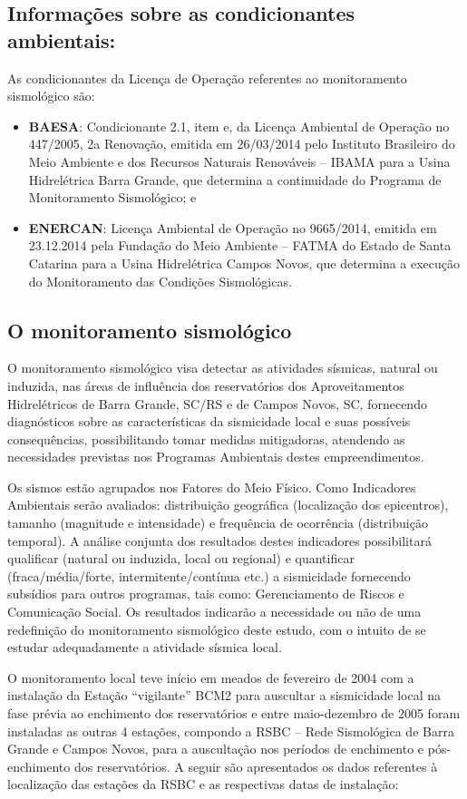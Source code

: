 \subsection{Informações sobre as condicionantes ambientais:}
As condicionantes da Licença de Operação referentes ao monitoramento sismológico são:
\begin{itemize}
    \item \textbf{BAESA}: Condicionante 2.1, item e, da Licença Ambiental de Operação no 447/2005, 2a Renovação, emitida em 26/03/2014 pelo Instituto Brasileiro do Meio Ambiente e dos Recursos Naturais Renováveis – IBAMA para a Usina Hidrelétrica Barra Grande, que determina a continuidade do Programa de Monitoramento Sismológico; e
    \item \textbf{ENERCAN}: Licença Ambiental de Operação no 9665/2014, emitida em 23.12.2014 pela Fundação do Meio Ambiente – FATMA do Estado de Santa Catarina para a Usina Hidrelétrica Campos Novos, que determina a execução do Monitoramento das Condições Sismológicas.
\end{itemize}

\subsection{O monitoramento sismológico}
\par{O monitoramento sismológico visa detectar as atividades sísmicas, natural ou induzida, nas áreas de influência dos reservatórios dos Aproveitamentos Hidrelétricos de Barra Grande, SC/RS e de Campos Novos, SC, fornecendo diagnósticos sobre as características da sismicidade local e suas possíveis consequências, possibilitando tomar medidas mitigadoras, atendendo as necessidades previstas nos Programas Ambientais destes empreendimentos.}
\par{Os sismos estão agrupados nos Fatores do Meio Físico. Como Indicadores Ambientais serão avaliados: distribuição geográfica (localização dos epicentros), tamanho (magnitude e intensidade) e frequência de ocorrência (distribuição temporal). A análise conjunta dos resultados destes indicadores possibilitará qualificar (natural ou induzida, local ou regional) e quantificar (fraca/média/forte, intermitente/contínua etc.) a sismicidade fornecendo subsídios para outros programas, tais como: Gerenciamento de Riscos e Comunicação Social. Os resultados indicarão a necessidade ou não de uma redefinição do monitoramento sismológico deste estudo, com o intuito de se estudar adequadamente a atividade sísmica local.}
\par{O monitoramento local teve início em meados de fevereiro de 2004 com a instalação da Estação “vigilante” BCM2 para auscultar a sismicidade local na fase  prévia ao enchimento dos reservatórios e entre maio-dezembro de 2005 foram instaladas as outras 4 estações, compondo a RSBC – Rede Sismológica de Barra Grande e Campos Novos, para a auscultação nos períodos de enchimento e pós-enchimento dos reservatórios.}
\clearpage
A seguir são apresentados os dados referentes à localização das estações da RSBC e as respectivas datas de instalação:

